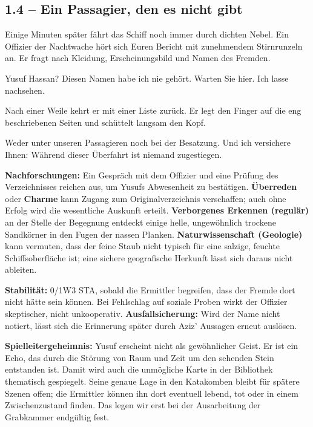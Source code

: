\subsection{1.4 -- Ein Passagier, den es nicht gibt}
\begin{vorlesetextalle}
Einige Minuten später fährt das Schiff noch immer durch dichten Nebel. Ein Offizier der Nachtwache hört sich Euren Bericht mit zunehmendem Stirnrunzeln an. Er fragt nach Kleidung, Erscheinungsbild und Namen des Fremden.

\glqq{}Yusuf Hassan? Diesen Namen habe ich nie gehört. Warten Sie hier. Ich lasse nachsehen.\grqq{}

Nach einer Weile kehrt er mit einer Liste zurück. Er legt den Finger auf die eng beschriebenen Seiten und schüttelt langsam den Kopf.

\glqq{}Weder unter unseren Passagieren noch bei der Besatzung. Und ich versichere Ihnen: Während dieser Überfahrt ist niemand zugestiegen.\grqq{}
\end{vorlesetextalle}
\begin{meisterinfo}
\textbf{Nachforschungen:} Ein Gespräch mit dem Offizier und eine Prüfung des Verzeichnisses reichen aus, um Yusufs Abwesenheit zu bestätigen. \textbf{Überreden} oder \textbf{Charme} kann Zugang zum Originalverzeichnis verschaffen; auch ohne Erfolg wird die wesentliche Auskunft erteilt. \textbf{Verborgenes Erkennen (regulär)} an der Stelle der Begegnung entdeckt einige helle, ungewöhnlich trockene Sandkörner in den Fugen der nassen Planken. \textbf{Naturwissenschaft (Geologie)} kann vermuten, dass der feine Staub nicht typisch für eine salzige, feuchte Schiffsoberfläche ist; eine sichere geografische Herkunft lässt sich daraus nicht ableiten.

\textbf{Stabilität:} 0/1W3 STA, sobald die Ermittler begreifen, dass der Fremde dort nicht hätte sein können. Bei Fehlschlag auf soziale Proben wirkt der Offizier skeptischer, nicht unkooperativ. \textbf{Ausfallsicherung:} Wird der Name nicht notiert, lässt sich die Erinnerung später durch Aziz' Aussagen erneut auslösen.

\textbf{Spielleitergeheimnis:} Yusuf erscheint nicht als gewöhnlicher Geist. Er ist ein Echo, das durch die Störung von Raum und Zeit um den sehenden Stein entstanden ist. Damit wird auch die unmögliche Karte in der Bibliothek thematisch gespiegelt. Seine genaue Lage in den Katakomben bleibt für spätere Szenen offen; die Ermittler können ihn dort eventuell lebend, tot oder in einem Zwischenzustand finden. Das legen wir erst bei der Ausarbeitung der Grabkammer endgültig fest.
\end{meisterinfo}

